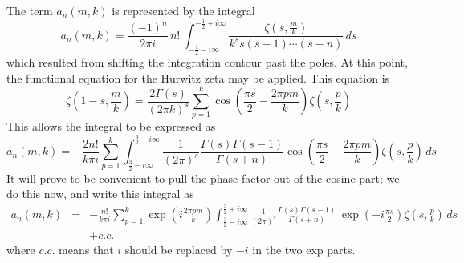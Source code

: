 \documentclass{amsart}
\begin{document}
\begin{comment}
Caution, there seems to be an extra factor of $k$ floating around;
I haven't tracked that down yet; these expressions may be too small/large
by factor of $k$. Also, am in the middle of changing notation, there
are errors due to this.
\end{comment}
The term $a_{n}(m,k)$ is represented by the integral\begin{equation}
a_{n}(m,k)=\frac{(-1)^{n}}{2\pi i}\, n!\,\int_{-\frac{1}{2}-i\infty}^{-\frac{1}{2}+i\infty}\frac{\zeta\left(s,\frac{m}{k}\right)}{k^{s}s(s-1)\cdots(s-n)}\, ds\label{eq:little-a-integral}\end{equation}
 which resulted from shifting the integration contour past the poles.
At this point, the functional equation for the Hurwitz zeta may be
applied. This equation is \begin{equation}
\zeta\left(1-s,\frac{m}{k}\right)=\frac{2\Gamma(s)}{(2\pi k)^{s}}\sum_{p=1}^{k}\cos\left(\frac{\pi s}{2}-\frac{2\pi pm}{k}\right)\zeta\left(s,\frac{p}{k}\right)\label{eq:}\end{equation}
 This allows the integral to be expressed as\begin{equation}
a_{n}(m,k)=-\frac{2n!}{k\pi i}\sum_{p=1}^{k}\int_{\frac{3}{2}-i\infty}^{\frac{3}{2}+i\infty}\frac{1}{(2\pi)^{s}}\frac{\Gamma(s)\Gamma(s-1)}{\Gamma(s+n)}\cos\left(\frac{\pi s}{2}-\frac{2\pi pm}{k}\right)\zeta\left(s,\frac{p}{k}\right)\, ds\label{eq:}\end{equation}
 It will prove to be convenient to pull the phase factor out of the
cosine part; we do this now, and write this integral as \begin{eqnarray}
a_{n}(m,k) & = & -\frac{n!}{k\pi i}\sum_{p=1}^{k}\exp\left(i\frac{2\pi pm}{k}\right)\int_{\frac{3}{2}-i\infty}^{\frac{3}{2}+i\infty}\frac{1}{(2\pi)^{s}}\frac{\Gamma(s)\Gamma(s-1)}{\Gamma(s+n)}\,\exp\left(-i\frac{\pi s}{2}\right)\zeta\left(s,\frac{p}{k}\right)\, ds\label{eq:two-integrals}\\
 &  & +c.c.\nonumber \end{eqnarray}
 where $c.c.$ means that $i$ should be replaced by $-i$ in the
two exp parts.
\end{document}
